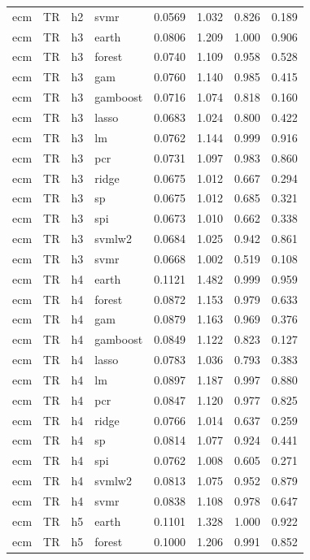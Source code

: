 \begin{ThreePartTable}
\begin{longtable}[t]{llclcccc}
ecm & TR & h2 & svmr & 0.0569 & 1.032 & 0.826 & 0.189\\
\addlinespace
ecm & TR & h3 & earth & 0.0806 & 1.209 & 1.000 & 0.906\\
ecm & TR & h3 & forest & 0.0740 & 1.109 & 0.958 & 0.528\\
ecm & TR & h3 & gam & 0.0760 & 1.140 & 0.985 & 0.415\\
ecm & TR & h3 & gamboost & 0.0716 & 1.074 & 0.818 & 0.160\\
ecm & TR & h3 & lasso & 0.0683 & 1.024 & 0.800 & 0.422\\
ecm & TR & h3 & lm & 0.0762 & 1.144 & 0.999 & 0.916\\
ecm & TR & h3 & pcr & 0.0731 & 1.097 & 0.983 & 0.860\\
ecm & TR & h3 & ridge & 0.0675 & 1.012 & 0.667 & 0.294\\
ecm & TR & h3 & sp & 0.0675 & 1.012 & 0.685 & 0.321\\
ecm & TR & h3 & spi & 0.0673 & 1.010 & 0.662 & 0.338\\
ecm & TR & h3 & svmlw2 & 0.0684 & 1.025 & 0.942 & 0.861\\
ecm & TR & h3 & svmr & 0.0668 & 1.002 & 0.519 & 0.108\\
\addlinespace
ecm & TR & h4 & earth & 0.1121 & 1.482 & 0.999 & 0.959\\
ecm & TR & h4 & forest & 0.0872 & 1.153 & 0.979 & 0.633\\
ecm & TR & h4 & gam & 0.0879 & 1.163 & 0.969 & 0.376\\
ecm & TR & h4 & gamboost & 0.0849 & 1.122 & 0.823 & 0.127\\
ecm & TR & h4 & lasso & 0.0783 & 1.036 & 0.793 & 0.383\\
ecm & TR & h4 & lm & 0.0897 & 1.187 & 0.997 & 0.880\\
ecm & TR & h4 & pcr & 0.0847 & 1.120 & 0.977 & 0.825\\
ecm & TR & h4 & ridge & 0.0766 & 1.014 & 0.637 & 0.259\\
ecm & TR & h4 & sp & 0.0814 & 1.077 & 0.924 & 0.441\\
ecm & TR & h4 & spi & 0.0762 & 1.008 & 0.605 & 0.271\\
ecm & TR & h4 & svmlw2 & 0.0813 & 1.075 & 0.952 & 0.879\\
ecm & TR & h4 & svmr & 0.0838 & 1.108 & 0.978 & 0.647\\
\addlinespace
ecm & TR & h5 & earth & 0.1101 & 1.328 & 1.000 & 0.922\\
ecm & TR & h5 & forest & 0.1000 & 1.206 & 0.991 & 0.852\\

\end{longtable}
\end{ThreePartTable}
